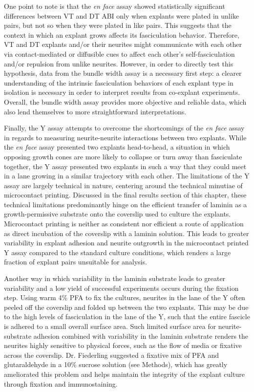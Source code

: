 One point to note is that the \emph{en face} assay showed statistically significant differences between VT and DT ABI only when explants were plated in unlike pairs, but not so when they were plated in like pairs.
This suggests that the context in which an explant grows affects its fasciculation behavior.
Therefore, VT and DT explants and/or their neurites might communicate with each other via contact-mediated or diffusible cues to affect each other's self-fasciculation and/or repulsion from unlike neurites.
However, in order to directly test this hypothesis, data from the bundle width assay is a necessary first step: a clearer understanding of the intrinsic fasciculation behaviors of each explant type in isolation is necessary in order to interpret results from co-explant experiments.
Overall, the bundle width assay provides more objective and reliable data, which also lend themselves to more straightforward interpretations.

Finally, the Y assay attempts to overcome the shortcomings of the \emph{en face} assay in regards to measuring neurite-neurite interactions between two explants.
While the \emph{en face} assay presented two explants head-to-head, a situation in which opposing growth cones are more likely to collapse or turn away than fasciculate together, the Y assay presented two explants in such a way that they could meet in a lane growing in a similar trajectory with each other.
The limitations of the Y assay are largely technical in nature, centering around the technical minutiae of microcontact printing.
Discussed in the final results section of this chapter, these technical limitations predominantly hinge on the efficient transfer of laminin as a growth-permissive substrate onto the coverslip used to culture the explants.
Microcontact printing is neither as consistent nor efficient a route of application as direct incubation of the coverslip with a laminin solution.
This leads to greater variability in explant adhesion and neurite outgrowth in the microcontact printed Y assay compared to the standard culture conditions, which renders a large fraction of explant pairs unsuitable for analysis.

Another way in which variability in the laminin substrate leads to greater variability and a low yield of successful experiments occurs during the fixation step.
Using warm 4\% PFA to fix the cultures, neurites in the lane of the Y often peeled off the coverslip and folded up between the two explants.
This may be due to the high levels of fasciculation in the lane of the Y, such that the entire fascicle is adhered to a small overall surface area.
Such limited surface area for neurite-substrate adhesion combined with variability in the laminin substrate renders the neurites highly sensitive to physical forces, such as the flow of media or fixative across the coverslip.
Dr. Fiederling suggested a fixative mix of PFA and glutaraldehyde in a 10\% sucrose solution (see Methods), which has greatly ameliorated this problem and helps maintain the integrity of the explant culture through fixation and immunostaining.

